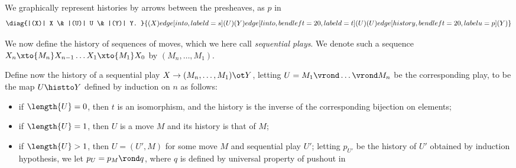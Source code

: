 \documentclass{LMCS}
\theoremstyle{plain}\newtheorem{satz}[thm]{Satz}
\begin{document}
We graphically represent histories by arrows between the presheaves,
as $p$ in
\begin{equation}
  \diag{|(X)| X \& |(U)| U \& |(Y)| Y. }{(X) edge[into,labeld={s}] (U) (Y) edge[linto,bend left=20,labeld={t}] (U) (U) edge[history,bend left=20,labelu={p}] (Y) }\label{eq:vmor}
\end{equation} 

We now define the history of sequences of moves, which we
here call \emph{sequential plays}. We denote
such a sequence $X_n \xto{M_n} X_{n-1} \ldots X_1 \xto{M_1} X_0$ by
$(M_n,\ldots,M_1)$.
\begin{defi}
  Define now the history of a sequential play $X \to (M_n,\ldots,M_1)
  \ot Y$, letting $U = M_1 \vrond \ldots \vrond M_n$ be the
  corresponding play, to be the map $U \histto Y$ defined by induction
  on $n$ as follows:
  \begin{itemize}
  \item if $\length{U} = 0$, then $t$ is an isomorphism, and the
    history is the inverse of the corresponding bijection on
    elements;
  \item if $\length{U} = 1$, then $U$ is a move $M$ and its
    history is that of $M$;
  \item if $\length{U} > 1$, then $U = (U', M)$ for some move
    $M$ and sequential play $U'$; letting $p_{U'}$ be the history of
    $U'$ obtained by induction hypothesis, we let $p_U = p_M \rond q$,
    where $q$ is defined by universal property of pushout in
    \begin{center}
    \end{center}
  \end{itemize}
\end{defi}
\end{document}
